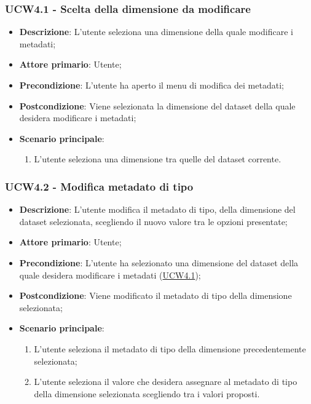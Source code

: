\newpage

\subsubsection{UCW4.1 - Scelta della dimensione da modificare}
\label{ssub:ucw4.1}

\begin{itemize}
    \item \textbf{Descrizione}: L’utente seleziona una dimensione della quale modificare i metadati;
    \item \textbf{Attore primario}: Utente;

    \item \textbf{Precondizione}:   L'utente ha aperto il menu di modifica dei metadati;
    \item \textbf{Postcondizione}:  Viene selezionata la dimensione del dataset della quale desidera modificare i
          metadati;

    \item \textbf{Scenario principale}:
          \begin{enumerate}
              \item L'utente seleziona una dimensione tra quelle del dataset corrente.
          \end{enumerate}
\end{itemize}

\subsubsection{UCW4.2 - Modifica metadato di tipo}
\label{ssub:ucw4.2}

\begin{itemize}
    \item \textbf{Descrizione}: L’utente modifica il metadato di tipo, della dimensione del dataset selezionata,
          scegliendo il nuovo valore tra le opzioni presentate;

    \item \textbf{Attore primario}: Utente;

    \item \textbf{Precondizione}:   L'utente ha selezionato una dimensione del dataset della quale desidera modificare
          i metadati (\hyperref[ssub:ucw4.1]{UCW4.1});
    \item \textbf{Postcondizione}:  Viene modificato il metadato di tipo della dimensione selezionata;

    \item \textbf{Scenario principale}:
          \begin{enumerate}
              \item L'utente seleziona il metadato di tipo della dimensione precedentemente selezionata;
              \item L'utente seleziona il valore che desidera assegnare al metadato di tipo della dimensione selezionata
                    scegliendo tra i valori proposti.
          \end{enumerate}


\end{itemize}


